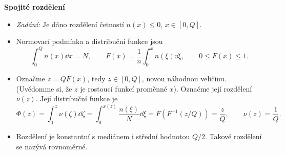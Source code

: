 \begin{example}
  \textbf{Spojité rozdělení}
    \begin{itemize}
      \item \emph{Zadání:} Je dáno rozdělení četností \(n(x) \leq 0,\, x \in [0, Q]\).
      \item Normovací podmínka a distribuční funkce jsou
            \begin{equation*}
              \int_{0}^{Q}n(x)\dd{x} = N, \qquad 
              F(x) = \dfrac{1}{n}\int_{0}^{x}n(\xi)\dd{\xi}, \qquad
              0 \leq F(x) \leq 1.
            \end{equation*}
      \item Označme \(z = QF(x)\), tedy \(z \in [0, Q]\), novou náhodnou veličinu. (Uvědomme si, že 
            \(z\) je rostoucí funkcí proměnné \(x\)). Označme její rozdělení \(\nu(z)\). Její 
            distribuční funkce je
            \begin{equation*}
              \Phi(z) = \int_{0}^{z}\nu(\zeta)\dd{\zeta} 
                      = \int_{0}^{x(z)}\dfrac{n(\xi)}{N}\dd{\xi}
                      = F\left(F^{-1}(z/Q)\right) 
                      = \dfrac{z}{Q}, \qquad
              \nu(z) = \dfrac{1}{Q}.
            \end{equation*}
      \item Rozdělení je konstantní s mediánem i střední hodnotou \(Q/2\). Takové rozdělení se 
            nazývá rovnoměrné.
    \end{itemize}
    
  
\normalsize
\end{example}
